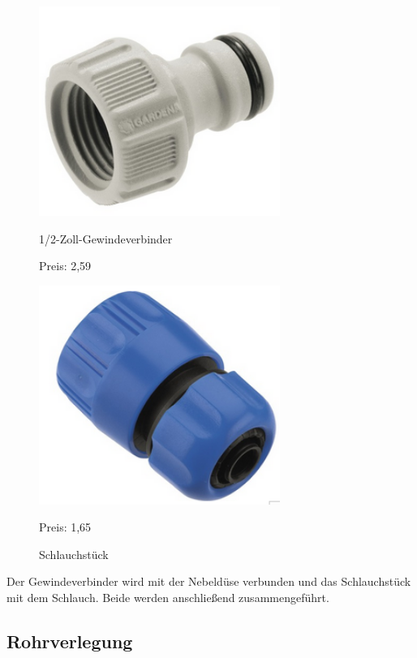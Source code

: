 \begin{figure}[H]
\begin{minipage}[t]{0.45\textwidth}
\includegraphics[width=0.7\textwidth]{fig/GardenaHahnverbinder}
\caption{1/2-Zoll-Gewindeverbinder}
Preis: 2,59 \textsf{\texteuro}
\end{minipage}
\hspace{0.1\textwidth}
\begin{minipage}[t]{0.45\textwidth}
\includegraphics[width=0.7\textwidth]{fig/Schlauchstueck}
\caption{Schlauchstück}
Preis: 1,65\textsf{\texteuro}
\end{minipage}
\end{figure}

Der Gewindeverbinder wird mit der Nebeldüse verbunden und das Schlauchstück mit dem Schlauch. Beide werden anschließend zusammengeführt.

\subsection{Rohrverlegung}
\label{sec:rohrverlegung}

